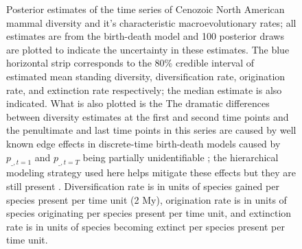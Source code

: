 \documentclass[12pt,letterpaper]{article}
\begin{document}
\begin{figure}[ht]
  \caption[Estimated mammal log-diversity and macroevolutionary rates for the Cenozoic]{Posterior estimates of the time series of Cenozoic North American mammal diversity and it's characteristic macroevolutionary rates; all estimates are from the birth-death model and 100 posterior draws are plotted to indicate the uncertainty in these estimates. The blue horizontal strip corresponds to the 80\% credible interval of estimated mean standing diversity, diversification rate, origination rate, and extinction rate respectively; the median estimate is also indicated. What is also plotted is the  The dramatic differences between diversity estimates at the first and second time points and the penultimate and last time points in this series are caused by well known edge effects in discrete-time birth-death models caused by \(p_{\_, t = 1}\) and \(p_{\_, t = T}\) being partially unidentifiable \citep{Royle2008}; the hierarchical modeling strategy used here helps mitigate these effects but they are still present \citep{Gelman2013d,Royle2008}. Diversification rate is in units of species gained per species present per time unit (2 My), origination rate is in units of species originating per species present per time unit, and extinction rate is in units of species becoming extinct per species present per time unit.}
  \label{fig:macro_values}
\end{figure}
\end{document}

